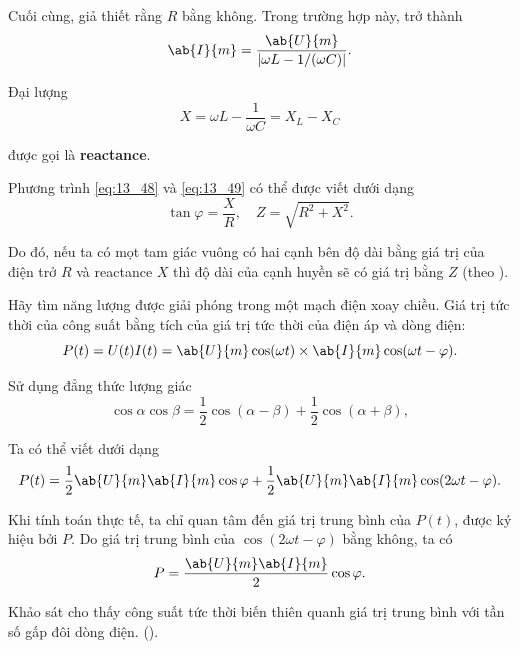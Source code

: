 Cuối cùng, giả thiết rằng $R$ bằng không.
Trong trường hợp này,  trở thành
\begin{equation}\label{eq:13_54}
    \ab{I}{m} = \frac{\ab{U}{m}}{|\omega L - 1/(\omega C)|}.
\end{equation}

\noindent
Đại lượng
\begin{equation}\label{eq:13_55}
    X = \omega L - \frac{1}{\omega C} = X_L - X_C
\end{equation}

\noindent
được gọi là \textbf{reactance}.

Phương trình \eqref{eq:13_48} và \eqref{eq:13_49} có thể được viết dưới dạng
\begin{equation*}
    \tan\varphi = \frac{X}{R},\quad Z = \sqrt{R^2+X^2}.
\end{equation*}

\noindent
Do đó, nếu ta có mọt tam giác vuông có hai cạnh bên độ dài bằng giá trị của điện trở $R$ và reactance $X$ thì độ dài của cạnh huyền sẽ có giá trị bằng $Z$ (theo ).

Hãy tìm năng lượng được giải phóng trong một mạch điện xoay chiều.
Giá trị tức thời của công suất bằng tích của giá trị tức thời của điện áp và dòng điện:
\begin{equation}\label{eq:13_56}
    P(t) = U(t)I(t) = \ab{U}{m} \cos(\omega t) \times \ab{I}{m} \cos(\omega t - \varphi).
\end{equation}

\noindent
Sử dụng đẳng thức lượng giác
\begin{equation*}
    \cos\alpha\cos\beta = \frac{1}{2}\cos(\alpha-\beta) + \frac{1}{2} \cos(\alpha+\beta),
\end{equation*}

\noindent
Ta có thể viết  dưới dạng
\begin{equation}\label{eq:13_57}
    P(t) = \frac{1}{2} \ab{U}{m} \ab{I}{m} \cos\varphi + \frac{1}{2} \ab{U}{m} \ab{I}{m} \cos(2\omega t - \varphi).
\end{equation}

Khi tính toán thực tế, ta chỉ quan tâm đến giá trị trung bình của $P(t)$, được ký hiệu bởi $P$.
Do giá trị trung bình của $\cos(2\omega t - \varphi)$ bằng không, ta có
\begin{equation}\label{eq:13_58}
    P = \frac{\ab{U}{m} \ab{I}{m}}{2} \cos\varphi.
\end{equation}

\noindent
Khảo sát  cho thấy công suất tức thời biến thiên quanh giá trị trung bình với tần số gấp đôi dòng điện. ().

